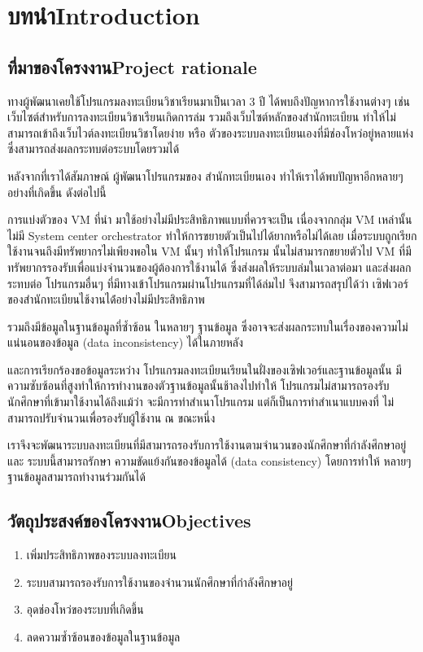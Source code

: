 \chapter{\ifcpe บทนำ\else Introduction\fi}

\section{\ifcpe ที่มาของโครงงาน\else Project rationale\fi}

ทางผู้พัฒนาเคยใช้โปรแกรมลงทะเบียนวิชาเรียนมาเป็นเวลา 3 ปี ได้พบถึงปัญหาการใช้งานต่างๆ เช่น เว็บไซต์สำหรับการลงทะเบียนวิชาเรียนเกิดการล่ม รวมถึงเว็บไซต์หลักของสำนักทะเบียน ทำให้ไม่สามารถเข้าถึงเว็บไวต์ลงทะเบียนวิชาโดยง่าย หรือ ตัวของระบบลงทะเบียนเองที่มีช่องโหว่อยู่หลายแห่ง ซึ่งสามารถส่งผลกระทบต่อระบบโดยรวมได้

หลังจากที่เราได้สัมภาษณ์ ผู้พัฒนาโปรแกรมของ สำนักทะเบียนเอง ทำไห้เราได้พบปัญหาอีกหลายๆ อย่างที่เกิดขึ้น ดังต่อไปนี้

การแบ่งตัวของ VM \cite{vm} ที่นำ มาใช้อย่างไม่มีประสิทธิภาพแบบที่ควรจะเป็น เนื่องจากกลุ่ม VM เหล่านั้นไม่มี System center orchestrator \cite{sco} ทำให้การขยายตัวเป็นไปได้ยากหรือไม่ได้เลย เมื่อระบบถูกเรียกใช้งานจนถึงมีทรัพยากรไม่เพียงพอใน VM นั้นๆ ทำให้โปรแกรม นั้นไม่สามารกขยายตัวไป VM ที่มีทรัพยากรรองรับเพื่อแบ่งจำนวนของผู้ต้องการใช้งานได้ ซึ่งส่งผลให้ระบบล่มในเวลาต่อมา และส่งผลกระทบต่อ โปรแกรมอื่นๆ ที่มีทางเข้าโปรแกรมผ่านโปรแกรมที่ได้ล่มไป จึงสามารถสรุปได้ว่า เซิฟเวอร์ของสำนักทะเบียนไช้งานได้่อย่างไม่มีประสิทธิภาพ

รวมถึงมีข้อมูลในฐานข้อมูลที่ซ้ำซ้อน ในหลายๆ ฐานข้อมูล ซึ่งอาจจะส่งผลกระทบในเรื่องของความไม่แน่นอนของข้อมูล (data inconsistency) ได้ในภายหลัง

และการเรียกร้องขอข้อมูลระหว่าง โปรแกรมลงทะเบียนเรียนในฝั่งของเซิฟเวอร์และฐานข้อมูลนั้น มีความซับซ้อนที่สูงทำให้การทำงานของตัวฐานข้อมูลนั้นช้าลงไปทำให้ โปรแกรมไม่สามารถรองรับนักศึกษาที่เข้ามาใช้งานได้ถึงแม้ว่า จะมีการทำสำเนาโปรแกรม แต่ก็เป็นการทำสำเนาแบบคงที่ ไม่สามารถปรับจำนวนเพื่อรองรับผู้ใช้งาน ณ ขณะหนึ่ง

เราจึงจะพัฒนาระบบลงทะเบียนที่มีสามารถรองรับการใช้งานตามจำนวนของนักศึกษาที่กำลังศึกษาอยู่ และ ระบบนี้สามารถรักษา ความขัดแย้งกันของข้อมูลได้ (data consistency) โดยการทำให้ หลายๆ ฐานข้อมูลสามารถทำงานร่วมกันได้

\section{\ifcpe วัตถุประสงค์ของโครงงาน\else Objectives\fi}
\begin{enumerate}
    \item เพิ่มประสิทธิภาพของระบบลงทะเบียน
    \item ระบบสามารถรองรับการใช้งานของจำนวนนักศึกษาที่กำลังศึกษาอยู่
    \item อุดช่องโหว่ของระบบที่เกิดขึ้น
    \item ลดความซ้ำซ้อนของข้อมูลในฐานข้อมูล
\end{enumerate}


